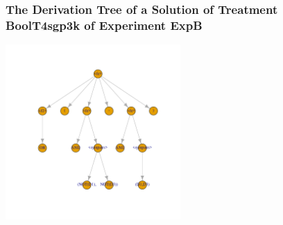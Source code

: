  \begin{frame}
 \frametitle{ The Derivation Tree of a Solution of Treatment BoolT4sgp3k of Experiment ExpB }
 \begin{center}
\includegraphics[width=0.5\textwidth, angle=0]
{ExpBDerivationTreeFigure021.pdf}
 \end{center}
 \label{report/ExpBDerivationTreeFigure021.pdf}  
 \end{frame}

